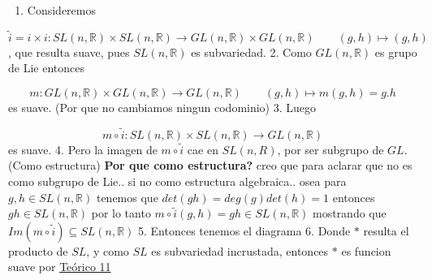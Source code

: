 \begin{bookproof}{}
\begin{enumerate}
\item Consideremos
\end{enumerate}
\[
\tilde{i}=i\times i:SL(n,\mathbb{R})\times SL(n,\mathbb{R})\to GL(n,\mathbb{R})\times GL(n,\mathbb{R})\qquad (g,h)\mapsto(g,h)
\]
, que resulta suave, pues $SL(n,\mathbb{R})$ es subvariedad. 2. Como $GL(n,\mathbb{R})$ es grupo de Lie entonces

\[
m:GL(n,\mathbb{R})\times GL(n,\mathbb{R})\to GL(n,\mathbb{R})\qquad (g,h)\mapsto m(g,h)=g.h
\]
es suave. (Por que no cambiamos ningun codominio) 3. Luego

\[
m\circ\tilde i:SL(n,\mathbb{R})\times SL(n,\mathbb{R})\to GL(n,\mathbb{R})
\]
es suave. 4. Pero la imagen de $m\circ\tilde i$ cae en $SL(n,R)$, por ser subgrupo de $GL$. (Como estructura) \textbf{Por que como estructura?} creo que para aclarar que no es como subgrupo de Lie.. si no como estructura algebraica.. osea para $g,h\in SL(n,\mathbb{R})$ tenemos que $det(gh)=deg(g)det(h)=1$ entonces $gh\in SL(n,\mathbb{R})$ por lo tanto $m\circ \tilde{i}(g,h)=gh\in SL(n,\mathbb{R})$ mostrando que $Im(m\circ \tilde{i})\subseteq SL(n,\mathbb{R})$ 5. Entonces tenemos el diagrama 
 6. Donde $*$ resulta el producto de $SL$, y como $SL$ es subvariedad incrustada, entonces $*$ es funcion suave por \hyperref[blk:300685]{Teórico 11}

\bookqed
\end{bookproof}
\label{blk:04a3ee}
